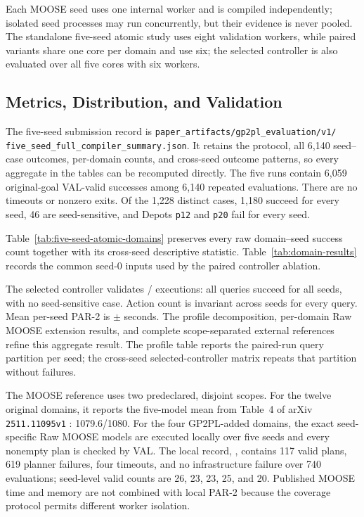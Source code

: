 Each MOOSE seed uses one internal worker and is compiled independently; isolated
seed processes may run concurrently, but their evidence is never pooled. The
standalone five-seed atomic study uses eight validation workers, while paired
variants share one core per domain and use six; the selected controller is also
evaluated over all five cores with six workers.

\subsection{Metrics, Distribution, and Validation}

The five-seed submission record is
\texttt{paper\_artifacts/gp2pl\_evaluation/v1/}
\texttt{five\_seed\_full\_compiler\_summary.json}. It retains the protocol,
all 6,140 seed--case outcomes, per-domain counts, and cross-seed outcome
patterns, so every aggregate in the tables can be recomputed directly. The five
runs contain 6,059 original-goal VAL-valid successes among
6,140 repeated evaluations. There are no timeouts or nonzero exits. Of the
1,228 distinct cases, 1,180 succeed for every seed, 46 are seed-sensitive, and
Depots \texttt{p12} and \texttt{p20} fail for every seed.

Table~\ref{tab:five-seed-atomic-domains} preserves every raw domain--seed
success count together with its cross-seed descriptive statistic.
Table~\ref{tab:domain-results} records the common seed-0 inputs used by the
paired controller ablation.





The selected controller validates
\TemporalCrossSeedValidCount{}/\TemporalCrossSeedEvaluationCount{} executions:
all \TemporalCrossSeedQueryCount{} queries succeed for all
\TemporalCrossSeedCount{} seeds, with no seed-sensitive case. Action count is
invariant across seeds for every query. Mean per-seed PAR-2 is
\TemporalCrossSeedMeanParTwoSeconds{} $\pm$
\TemporalCrossSeedParTwoSDSeconds{} seconds. The profile decomposition,
per-domain Raw MOOSE extension results, and complete scope-separated external
references refine this aggregate result.
The profile table reports the paired-run query partition per seed; the
cross-seed selected-controller matrix repeats that partition without failures.



The MOOSE reference uses two predeclared, disjoint scopes. For the twelve
original domains, it reports the five-model mean from Table~4 of arXiv
\texttt{2511.11095v1} \cite{Chen2025MooseExtended}: 1079.6/1080. For the four
GP2PL-added domains, the exact seed-specific Raw MOOSE models are executed
locally over five seeds and every nonempty plan is checked by VAL. The local
record, , contains 117
valid plans, 619 planner failures, four timeouts, and no infrastructure failure
over 740 evaluations; seed-level valid counts are 26, 23, 23, 25, and 20.
Published MOOSE time and memory are not combined with local PAR-2 because the
coverage protocol permits different worker isolation.

